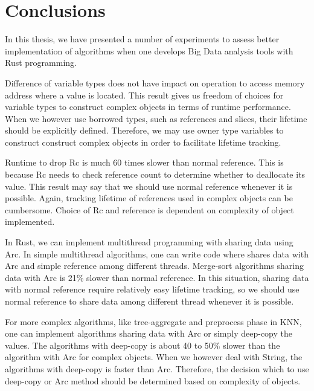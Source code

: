 \chapter{Conclusions}
\label{chapter:Conclusions}
\thispagestyle{myheadings}

\graphicspath{{3_Conclusion/Figures/}}

In this thesis, we have presented a number of experiments to assess better implementation of algorithms 
when one develops Big Data analysis tools with Rust programming. 

Difference of variable types does not have impact on operation to access memory address where a value is located. 
This result gives us freedom of choices for variable types to construct complex objects in terms of runtime performance. 
When we however use borrowed types, such as references and slices, their lifetime should be explicitly defined. 
Therefore, we may use owner type variables to construct construct complex objects in order to facilitate lifetime tracking.

Runtime to drop Rc is much 60 times slower than normal reference. This is because Rc needs to check reference count to determine whether to deallocate its value. 
This result may say that we should use normal reference whenever it is possible. 
Again, tracking lifetime of references used in complex objects can be cumbersome. 
Choice of Rc and reference is dependent on complexity of object implemented.

In Rust, we can implement multithread programming with sharing data using Arc. In simple multithread algorithms, 
one can write code where shares data with Arc and simple reference among different threads.
Merge-sort algorithms sharing data with Arc is 21\% slower than normal reference. 
In this situation, sharing data with normal reference require relatively easy lifetime tracking, 
so we should use normal reference to share data among different thread whenever it is possible.

For more complex algorithms, like tree-aggregate and preprocess phase in KNN, one can implement algorithms sharing data with Arc or simply deep-copy the values.
The algorithms with deep-copy is about 40 to 50\% slower than the algorithm with Arc for complex objects.
When we however deal with String, the algorithms with deep-copy is faster than Arc. 
Therefore, the decision which to use deep-copy or Arc method should be determined based on complexity of objects.

